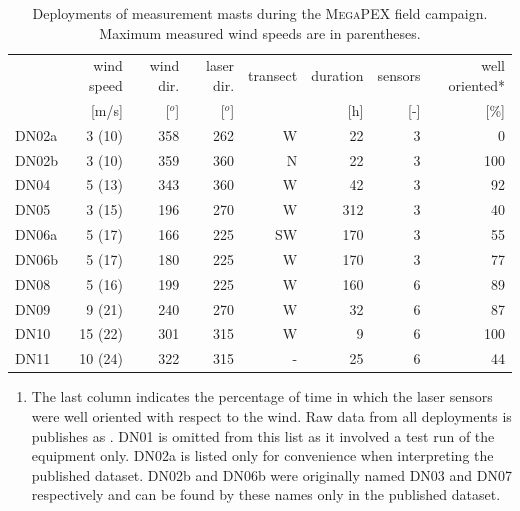 \begin{table}[h]
  \centering
  \caption{Deployments of measurement masts during the \textsc{MegaPEX} field
    campaign. Maximum measured wind speeds are in parentheses.}
  \label{tab:deployments}
  \begin{tabular}[h]{lrrrrrrr}
    \hline
               & wind speed &  wind dir. & laser dir. &   transect &   duration & sensors &     well oriented* \\
               &      [m/s] &     [$^o$] &     [$^o$] &            &        [h] &     [-] &       [\%] \\
    \hline
    DN02a      &     3 (10) &        358 &        262 &          W &         22 &       3 &          0 \\
    DN02b      &     3 (10) &        359 &        360 &          N &         22 &       3 &        100 \\
    DN04       &     5 (13) &        343 &        360 &          W &         42 &       3 &         92 \\
    DN05       &     3 (15) &        196 &        270 &          W &        312 &       3 &         40 \\
    DN06a      &     5 (17) &        166 &        225 &         SW &        170 &       3 &         55 \\
    DN06b      &     5 (17) &        180 &        225 &          W &        170 &       3 &         77 \\
    DN08       &     5 (16) &        199 &        225 &          W &        160 &       6 &         89 \\
    DN09       &     9 (21) &        240 &        270 &          W &         32 &       6 &         87 \\
    DN10       &    15 (22) &        301 &        315 &          W &          9 &       6 &        100 \\
    DN11       &    10 (24) &        322 &        315 &          - &         25 &       6 &         44 \\
    \hline
  \end{tabular}

  \footnotesize{
    \begin{enumerate}[{*}]
    \item The last column indicates the percentage of time in which
      the laser sensors were well oriented with respect to the wind.
      Raw data from all deployments is publishes as \citet{megapex}.
      DN01 is omitted from this list as it involved a test run of the
      equipment only. DN02a is listed only for convenience when
      interpreting the published dataset. DN02b and DN06b were
      originally named DN03 and DN07 respectively and can be found by
      these names only in the published dataset.
    \end{enumerate}}
\end{table}

